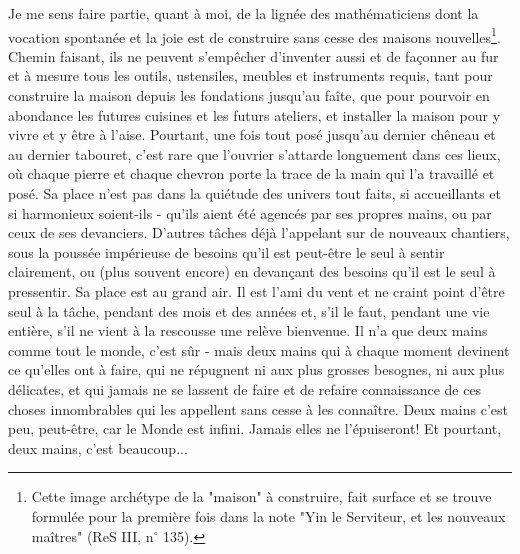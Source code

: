 Je me sens faire partie, quant à moi, de la lignée des mathématiciens dont la vocation spontanée et la joie est de construire sans cesse des maisons nouvelles\footnote{Cette image archétype de la "maison" à construire, fait surface et se trouve formulée pour la première fois dans la note "Yin le Serviteur, et les nouveaux maîtres" (ReS III, n$^{\circ}$ 135).}. Chemin faisant, ils ne peuvent s'empêcher d'inventer aussi et de façonner au fur et à mesure tous les outils, ustensiles, meubles et instruments requis, tant pour construire la maison depuis les fondations jusqu'au faîte, que pour pourvoir en abondance les futures cuisines et les futurs ateliers, et installer la maison pour y vivre et y être à l'aise. Pourtant, une fois tout posé jusqu'au dernier chêneau et au dernier tabouret, c'est rare que l'ouvrier s'attarde longuement dans ces lieux, où chaque pierre et chaque chevron porte la trace de la main qui l'a travaillé et posé. Sa place n'est pas dans la quiétude des univers tout faits, si accueillants et si harmonieux soient-ils - qu'ils aient été agencés par ses propres mains, ou par ceux de ses devanciers. D'autres tâches déjà l'appelant sur de nouveaux chantiers, sous la poussée impérieuse de besoins qu'il est peut-être le seul à sentir clairement, ou (plus souvent encore) en devançant des besoins qu'il est le seul à pressentir. Sa place est au grand air. Il est l'ami du vent et ne craint point d'être seul à la tâche, pendant des mois et des années et, s'il le faut, pendant une vie entière, s'il ne vient à la rescousse une relève bienvenue. Il n'a que deux mains comme tout le monde, c'est sûr - mais deux mains qui à chaque moment devinent ce qu'elles ont à faire, qui ne répugnent ni aux plus grosses besognes, ni aux plus délicates, et qui jamais ne se lassent de faire et de refaire connaissance de ces choses innombrables qui les appellent sans cesse à les connaître. Deux mains c'est peu, peut-être, car le Monde est infini. Jamais elles ne l'épuiseront! Et pourtant, deux mains, c'est beaucoup...

